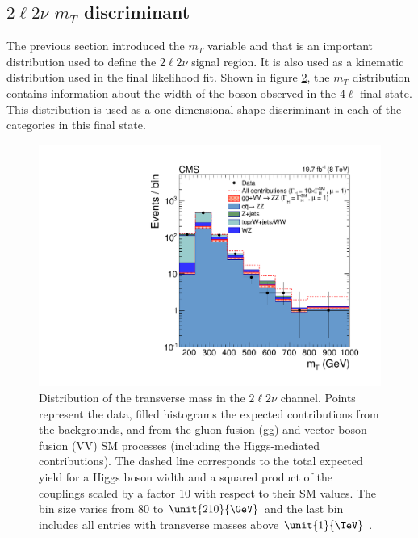 \begin{figure}
{}
\label{fig:kd-discr}
\end{figure}

\subsection{\texorpdfstring{$2\ell2\nu$ $m_{T}$}{2l2nu mT} discriminant}
\label{sec:2l2nu_mT}

The previous section introduced the $m_{T}$ variable and that is an important distribution used to define the $2\ell2\nu$ signal region. It is also used as a kinematic distribution used in the final likelihood fit. Shown in figure \ref{fig:mtfit}, the $m_{T}$ distribution contains information about the width of the boson observed in the $4\ell$ final state. This distribution is used as a one-dimensional shape discriminant in each of the categories in this final state.


\begin{figure}[htb]
\centering
\includegraphics[width=0.45\linewidth]{HZZ_Width/fig4_new.pdf}
\caption[Distribution of the transverse mass in the $2\ell2\nu$ channel. Points represent
the data, filled histograms the expected contributions from the backgrounds, and
from the gluon fusion (gg) and vector boson fusion (VV) SM processes (including
the Higgs-mediated contributions). The dashed line corresponds to the total expected
yield for a Higgs boson width and a squared product of the couplings scaled by a
factor 10 with respect to their SM values.
The bin size varies from 80 to $\unit{210}{\GeV}$ and the last bin includes all entries with
transverse masses above $\unit{1}{\TeV}$.]{
Distribution of the transverse mass in the $2\ell2\nu$ channel. Points represent
the data, filled histograms the expected contributions from the backgrounds, and
from the gluon fusion (gg) and vector boson fusion (VV) SM processes (including
the Higgs-mediated contributions). The dashed line corresponds to the total expected
yield for a Higgs boson width and a squared product of the couplings scaled by a
factor 10 with respect to their SM values.
The bin size varies from 80 to $\unit{210}{\GeV}$ and the last bin includes all entries with
transverse masses above $\unit{1}{\TeV}$ \cite{Khachatryan:2014iha}.}
\label{fig:mtfit}
\end{figure}


